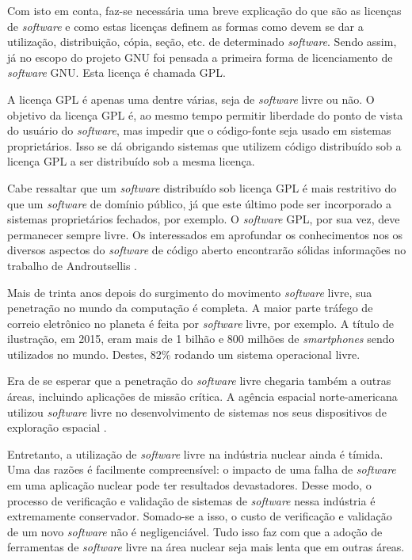 Com isto em conta, faz-se necessária uma breve explicação do que são as licenças
de \textit{software} e como estas licenças definem as formas como devem se dar a utilização, distribuição, cópia, seção, etc. de determinado \textit{software}. Sendo assim,
já no escopo do projeto GNU \cite{Stallman1985} foi pensada a primeira forma
de licenciamento de \textit{software}
GNU. Esta licença é chamada GPL.

A licença GPL é apenas uma dentre várias, seja de \textit{software} livre ou
não. O objetivo da licença GPL é, ao mesmo tempo permitir liberdade do ponto de vista
do usuário do \textit{software}, mas impedir que o código-fonte seja usado em sistemas proprietários. Isso se dá obrigando sistemas que utilizem código
distribuído sob a licença GPL a ser distribuído sob a mesma licença.

Cabe ressaltar que um \textit{software} distribuído sob licença GPL é mais restritivo do
que um \textit{software} de domínio público, já que este último pode ser incorporado
a sistemas proprietários fechados, por exemplo. O \textit{software} GPL, por sua vez,
deve permanecer sempre livre. Os interessados em aprofundar os conhecimentos nos
os diversos aspectos do \textit{software} de código aberto encontrarão sólidas informações
no trabalho de Androutsellis \cite{Androutsellis2010}.

Mais de trinta anos depois do surgimento do movimento \textit{software} livre,
sua penetração no mundo da computação é completa. A maior parte tráfego de correio
eletrônico no planeta é feita por \textit{software} livre, por exemplo.  A título
de ilustração, em 2015, eram mais de 1 bilhão e 800 milhões de \textit{smartphones}
sendo utilizados no mundo. Destes, 82\% rodando um sistema operacional livre.

Era de se esperar que a penetração do \textit{software} livre chegaria também a outras
áreas, incluindo aplicações de missão crítica. A agência espacial norte-americana
utilizou \textit{software} livre no desenvolvimento de sistemas nos seus dispositivos
de exploração espacial \cite{Norris2004}.

Entretanto, a utilização de \textit{software} livre na indústria nuclear ainda é tímida.
Uma das razões é facilmente compreensível: o impacto de uma falha de \textit{software}
em uma aplicação nuclear pode ter resultados devastadores. Desse modo, o processo de
verificação e validação de sistemas de \textit{software} nessa indústria é extremamente
conservador. Somado-se a isso, o custo de verificação e validação de um novo \textit{software}
não é negligenciável. Tudo isso faz com que a adoção de ferramentas de \textit{software}
livre na área nuclear seja mais lenta que em outras áreas.

